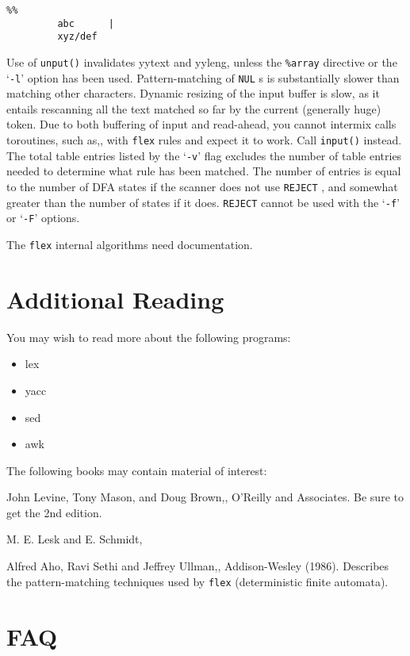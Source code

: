 \documentclass[openany,oneside]{book}
\begin{document}
\begin{verbatim}
%%
         abc      |
         xyz/def
\end{verbatim}


Use of \verb`unput()` invalidates yytext and yyleng, unless the \verb`%array` directive or the ‘\verb`-l`’ option has been used. 
Pattern-matching of \verb`NUL` s is substantially slower than matching
other characters.  Dynamic resizing of the input buffer is slow, as it
entails rescanning all the text matched so far by the current (generally
huge) token.  Due to both buffering of input and read-ahead, you cannot
intermix calls toroutines, such as,,
with \verb`flex` rules and expect it to work.  Call \verb`input()` instead.  The total table entries listed by the ‘\verb`-v`’ flag excludes
the number of table entries needed to determine what rule has been
matched.  The number of entries is equal to the number of DFA states if
the scanner does not use \verb`REJECT` , and somewhat greater than the
number of states if it does. \verb`REJECT` cannot be used with the
‘\verb`-f`’ or ‘\verb`-F`’ options.

The \verb`flex` internal algorithms need documentation.
\chapter{Additional Reading}


You may wish to read more about the following programs:
\begin{itemize}
\item lex
\item yacc
\item sed
\item awk
\end{itemize}


The following books may contain material of interest:

John Levine, Tony Mason, and Doug Brown,,
O'Reilly and Associates.  Be sure to get the 2nd edition.

M. E. Lesk and E. Schmidt,

Alfred Aho, Ravi Sethi and Jeffrey Ullman,, Addison-Wesley (1986).  Describes the
pattern-matching techniques used by \verb`flex` (deterministic finite
automata).

\backmatter

\chapter{FAQ}
\end{document}
